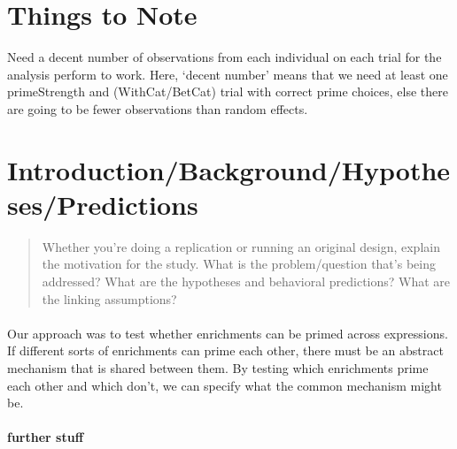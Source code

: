 \documentclass[10pt]{article}
\begin{document}
\maketitle

\begin{multicols}{2}

  \section{Things to Note}
\label{sec:things-note}

Need a decent number of observations from each individual on each trial for the analysis \citeauthor{Bott:2016aa} perform to work.
Here, `decent number' means that we need at least one primeStrength and (WithCat/BetCat) trial with correct prime choices, else there are going to be fewer observations than random effects.

\section{Introduction/Background/Hypotheses/Predictions}
\label{sec:introduction}

\begin{quote}
  Whether you're doing a replication or running an original design, explain the motivation for the study.
  What is the problem/question that's being addressed?
  What are the hypotheses and behavioral predictions?
  What are the linking assumptions?
\end{quote}


\paragraph{\textcite{Bott:2016aa}}


Our approach was to test whether enrichments can be primed across expressions. If different sorts of enrichments can prime each other, there must be an abstract mechanism that is shared between them. By testing which enrichments prime each other and which don’t, we can specify what the common mechanism might be.


\paragraph{further stuff}


\end{multicols}
\end{document}
